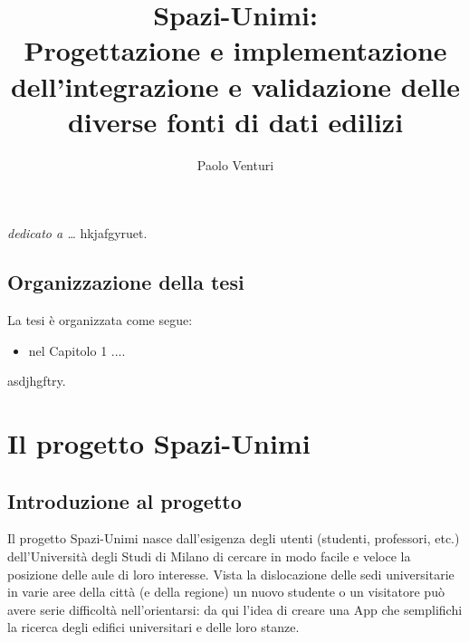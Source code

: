 \documentclass[12pt]{report}
\begin{document}
 

\title{Spazi-Unimi: \\Progettazione e implementazione dell'integrazione e validazione delle diverse fonti di dati edilizi}
\author{Paolo Venturi}
%
% 
%
\beforepreface
\prefacesection{}
        {\hfill \Large {\sl dedicato a \dots}}
% 
%
hkjafgyruet.
%
%
\section*{Organizzazione della tesi}
\label{organizzazione}
La tesi \`e organizzata come segue:
\begin{itemize}
\item nel Capitolo 1 ....
\end{itemize}
%
%
asdjhgftry.
\afterpreface
% 
% 
\chapter{Il progetto Spazi-Unimi}
\label{cap1}

\section{Introduzione al progetto}

Il progetto Spazi-Unimi nasce dall’esigenza degli utenti (studenti, professori, etc.) dell’Università degli Studi di Milano di cercare in modo facile e veloce la posizione delle aule di loro interesse. 
Vista la dislocazione delle sedi universitarie in varie aree della città (e della regione) un nuovo studente o un visitatore può avere serie difficoltà nell’orientarsi: da qui l’idea di creare una App che semplifichi la ricerca degli edifici universitari e delle loro stanze. 
\end{document}
